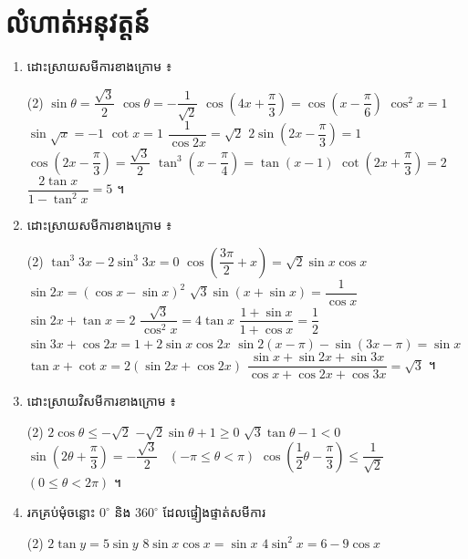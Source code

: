 \section*{លំហាត់អនុវត្តន៍}
\begin{enumerate}[1]
  \item ដោះស្រាយសមីការខាងក្រោម ៖
  \begin{tasks}(2)
    \task $\sin\theta = \dfrac{\sqrt{3}}{2}$
    \task $\cos\theta = -\dfrac{1}{\sqrt{2}}$
    \task $\cos\left(4x + \dfrac{\pi}{3}\right) = \cos\left(x - \dfrac{\pi}{6}\right)$
    \task $\cos^2 x = 1$
    \task $\sin\sqrt{x} = -1$
    \task $\cot x = 1$
    \task $\dfrac{1}{\cos 2x} = \sqrt{2}$
    \task $2\sin\left(2x - \dfrac{\pi}{3}\right) = 1$
    \task $\cos\left(2x - \dfrac{\pi}{3}\right) = \dfrac{\sqrt{3}}{2}$
    \task $\tan^3\left(x - \dfrac{\pi}{4}\right) = \tan(x - 1)$
    \task $\cot\left(2x + \dfrac{\pi}{3}\right) = 2$
    \task $\dfrac{2\tan x}{1 - \tan^2 x} = 5$ ។
  \end{tasks}
  \item ដោះស្រាយសមីការខាងក្រោម ៖
  \begin{tasks}(2)
    \task $\tan^3 3x - 2\sin^3 3x = 0$
    \task $\cos\left(\dfrac{3\pi}{2} + x\right) = \sqrt{2}\sin x\cos x$
    \task $\sin 2x = (\cos x - \sin x)^2$
    \task $\sqrt{3}\sin(x + \sin x) = \dfrac{1}{\cos x}$
    \task $\sin 2x + \tan x = 2$
    \task $\dfrac{\sqrt{3}}{\cos^2 x} = 4\tan x$
    \task $\dfrac{1 + \sin x}{1 + \cos x} = \dfrac{1}{2}$
    \task $\sin 3x + \cos 2x = 1 + 2\sin x\cos 2x$
    \task $\sin 2(x - \pi) - \sin(3x - \pi) = \sin x$
    \task $\tan x + \cot x = 2(\sin 2x + \cos 2x)$
    \task $\dfrac{\sin x + \sin 2x + \sin 3x}{\cos x + \cos 2x + \cos 3x} = \sqrt{3}$ ។
  \end{tasks}
  \item ដោះស្រាយវិសមីការខាងក្រោម ៖
  \begin{tasks}(2)
    \task $2\cos\theta \le -\sqrt{2}$
    \task $-\sqrt{2}\sin\theta + 1 \ge 0$
    \task $\sqrt{3}\tan\theta - 1 < 0$
    \task $\sin\left(2\theta + \dfrac{\pi}{3}\right) = -\dfrac{\sqrt{3}}{2}$ \ $(-\pi \le \theta < \pi)$
    \task $\cos\left(\dfrac{1}{2}\theta - \dfrac{\pi}{3}\right) \le \dfrac{1}{\sqrt{2}}$ \ $(0 \le \theta < 2\pi)$ ។
  \end{tasks}
  \item រកគ្រប់មុំចន្លោះ $0^\circ$ និង $360^\circ$ ដែលផ្ទៀងផ្ទាត់សមីការ
  \begin{tasks}(2)
    \task $2\tan y = 5\sin y$
    \task $8\sin x\cos x = \sin x$
    \task $4\sin^2 x = 6 - 9\cos x$

\end{tasks}
\end{enumerate}
